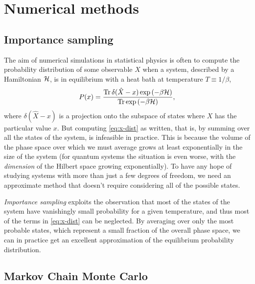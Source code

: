 \chapter{Numerical methods}
\label{chap:numerical}


%


\section{Importance sampling}

The aim of numerical simulations in statistical physics is often to compute the
probability distribution of some observable $X$ when a system, described by a
Hamiltonian $\mathcal{H}$, is in equilibrium with a heat bath at temperature $T \equiv
1/\beta$,
\begin{equation}
  P(x) =
  \frac{\operatorname{Tr} \delta(\hat{X}-x)\exp\left(-\beta \mathcal{H}\right)}
       {\operatorname{Tr} \exp\left(-\beta \mathcal{H}\right)},
  \label{eq:x-dist}
\end{equation}
where $\delta(\hat{X}-x)$ is a projection onto the subspace of states where $X$
has the particular value $x$. But computing \cref{eq:x-dist} as written, that
is, by summing over all the states of the system, is infeasible in practice.
This is because the volume of the phase space over which we must average grows
at least exponentially in the size of the system (for quantum systems the
situation is even worse, with the \emph{dimension} of the Hilbert space growing
exponentially). To have any hope of studying systems with more than just a few
degrees of freedom, we need an approximate method that doesn't require
considering all of the possible states.

\emph{Importance sampling} exploits the observation that most of the states of
the system have vanishingly small probability for a given temperature, and thus
most of the terms in \cref{eq:x-dist} can be neglected. By averaging over only
the most probable states, which represent a small fraction of the overall phase
space, we can in practice get an excellent approximation of the equilibrium
probability distribution.


\section{Markov Chain Monte Carlo}

